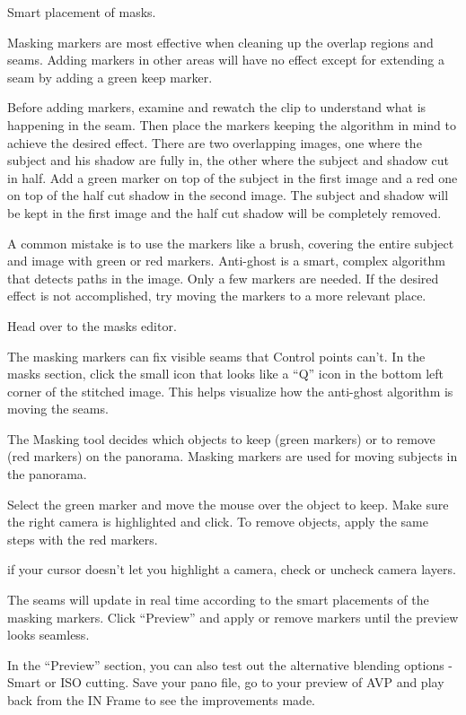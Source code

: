\begin{fullwidth}
{\large Smart placement of masks. \par}

Masking markers are most effective when cleaning up the overlap regions and seams. Adding markers in other areas will have no effect except for extending a seam by adding a green keep marker. 

Before adding markers, examine and rewatch the clip to understand what is happening in the seam. Then place the markers keeping the algorithm in mind to achieve the desired effect. There are two overlapping images, one where the subject and his shadow are fully in, the other where the subject and shadow cut in half. Add a green marker on top of the subject in the first image and a red one on top of the half cut shadow in the second image. The subject and shadow will be kept in the first image and the half cut shadow will be completely removed. 


A common mistake is to use the markers like a brush, covering the entire subject and image with green or red markers. Anti-ghost is a smart, complex algorithm that detects paths in the image. Only a few markers are needed. If the desired effect is not accomplished, try moving the markers to a more relevant place. 


Head over to the masks editor.


The masking markers can fix visible seams that Control points can’t. In the masks section, click the small icon that looks like a “Q” icon in the bottom left corner of the stitched image. This helps visualize how the anti-ghost algorithm is moving the seams.


The Masking tool decides which objects to keep (green markers) or to remove (red markers) on the panorama. Masking markers are used for moving subjects in the panorama.

Select the green marker and move the mouse over the object to keep. Make sure the right camera is highlighted and click. To remove objects, apply the same steps with the red markers.


\tip if your cursor doesn’t let you highlight a camera, check or uncheck camera layers.


The seams will update in real time according to the smart placements of the masking markers. Click “Preview” and apply or remove markers until the preview looks seamless.



In the “Preview” section, you can also test out the alternative blending options - Smart or ISO cutting. Save your pano file, go to your preview of AVP and play back from the IN Frame to see the improvements made.


\clearpage
\end{fullwidth}